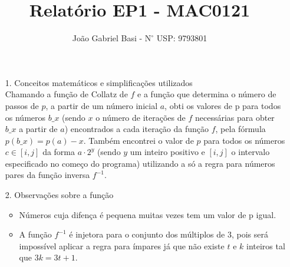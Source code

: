 \documentclass[12pt, a4paper]{article} %
\title{Relatório EP1 - MAC0121}
\date{}
\author{João Gabriel Basi - $\text{N}^\circ$ USP: 9793801}
\begin{document}
\maketitle
\begin{enumerate}
\item[1.]Conceitos matemáticos e simplificações utilizados\\
Chamando a função de Collatz de $f$ e a função que determina o número de passos de $p$, a partir de um número inicial $a$, obti os valores de p para todos os números $b\_x$ (sendo $x$ o número de iterações de $f$ necessárias para obter $b\_x$ a partir de $a$) encontrados a cada iteração da função $f$,  pela fórmula $p(b\_x) = p(a) - x$. Também encontrei o valor de $p$ para todos os números $c\in[i,j]$ da forma $a\cdot2^y$ (sendo $y$ um inteiro positivo e $[i,j]$ o intervalo especificado no começo do programa) utilizando a só a regra para números pares da função inversa $f^{-1}$.
\item[2.]Observações sobre a função\\
\begin{itemize}
\item Números cuja difença é pequena muitas vezes tem um valor de p igual.
\item A função $f^{-1}$ é injetora para o conjunto dos múltiplos de $3$, pois será impossível aplicar a regra para ímpares já que não existe $t$ e $k$ inteiros tal que $3k = 3t+1$.
\end{itemize}
\end{enumerate}
\end{document}
